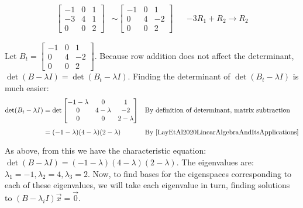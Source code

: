 \documentclass[10pt,letterpaper,final]{report}
\newcommand{\reason}[1]{&& \text{#1}}
\begin{document}
\begin{enumerate}[label=(\alph*)]
\begin{align*}
          \begin{bmatrix}
            -1 & 0 & 1 \\
            -3 & 4 & 1 \\
            0  & 0 & 2
          \end{bmatrix} & \sim \begin{bmatrix}
                                 -1 & 0 & 1  \\
                                 0  & 4 & -2 \\
                                 0  & 0 & 2
                               \end{bmatrix} \reason{$-3R_1 + R_2 \to R_2$}
        \end{align*}

        Let $B_t = \begin{bmatrix}
            -1 & 0 & 1  \\
            0  & 4 & -2 \\
            0  & 0 & 2
          \end{bmatrix}$. Because row addition does not affect the determinant, $\det (B - \lambda I) = \det (B_t - \lambda I)$.
        Finding the determinant of $\det (B_t - \lambda I)$ is much easier:
        \begin{align*}
          \det (B_t - \lambda I) & = \det \begin{bmatrix}
                                            -1 - \lambda & 0           & 1           \\
                                            0            & 4 - \lambda & -2          \\
                                            0            & 0           & 2 - \lambda
                                          \end{bmatrix} \reason{By definition of determinant, matrix subtraction}                                                \\[1ex]
                                 & = (-1 - \lambda)(4 - \lambda)(2 - \lambda) \reason{By \cite[Theorem~5.3, p.~283]{LayEtAl2020LinearAlgebraAndItsApplications}} \\[1ex]
        \end{align*}
        As above, from this we have the characteristic equation: $\det (B - \lambda I) = (-1 - \lambda)(4 - \lambda)(2 - \lambda)$. The eigenvalues are: $\lambda_1 = -1, \lambda_2 = 4, \lambda_3 = 2$.
        Now, to find bases for the eigenspaces corresponding to each of these eigenvalues, we will take each eigenvalue in turn, finding solutions to $(B-\lambda_i I)\vec{x} = \vec{0}$.
        \pagebreak


\end{enumerate}
\end{document}
